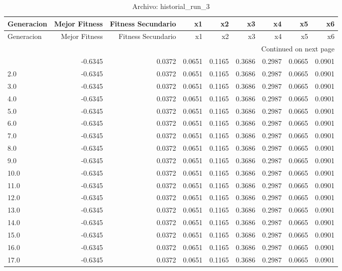 \begin{longtable}{lrrrrrrrr}
\caption{Archivo: historial\_run\_3}\label{tab:historial_run_3} \\
\toprule
Generacion & Mejor Fitness & Fitness Secundario & x1 & x2 & x3 & x4 & x5 & x6 \\
\midrule
\endfirsthead
\toprule
Generacion & Mejor Fitness & Fitness Secundario & x1 & x2 & x3 & x4 & x5 & x6 \\
\midrule
\endhead
\midrule
\multicolumn{9}{r}{Continued on next page} \\
\midrule
\endfoot
\bottomrule
\endlastfoot
1.0 & -0.6345 & 0.0372 & 0.0651 & 0.1165 & 0.3686 & 0.2987 & 0.0665 & 0.0901 \\
2.0 & -0.6345 & 0.0372 & 0.0651 & 0.1165 & 0.3686 & 0.2987 & 0.0665 & 0.0901 \\
3.0 & -0.6345 & 0.0372 & 0.0651 & 0.1165 & 0.3686 & 0.2987 & 0.0665 & 0.0901 \\
4.0 & -0.6345 & 0.0372 & 0.0651 & 0.1165 & 0.3686 & 0.2987 & 0.0665 & 0.0901 \\
5.0 & -0.6345 & 0.0372 & 0.0651 & 0.1165 & 0.3686 & 0.2987 & 0.0665 & 0.0901 \\
6.0 & -0.6345 & 0.0372 & 0.0651 & 0.1165 & 0.3686 & 0.2987 & 0.0665 & 0.0901 \\
7.0 & -0.6345 & 0.0372 & 0.0651 & 0.1165 & 0.3686 & 0.2987 & 0.0665 & 0.0901 \\
8.0 & -0.6345 & 0.0372 & 0.0651 & 0.1165 & 0.3686 & 0.2987 & 0.0665 & 0.0901 \\
9.0 & -0.6345 & 0.0372 & 0.0651 & 0.1165 & 0.3686 & 0.2987 & 0.0665 & 0.0901 \\
10.0 & -0.6345 & 0.0372 & 0.0651 & 0.1165 & 0.3686 & 0.2987 & 0.0665 & 0.0901 \\
11.0 & -0.6345 & 0.0372 & 0.0651 & 0.1165 & 0.3686 & 0.2987 & 0.0665 & 0.0901 \\
12.0 & -0.6345 & 0.0372 & 0.0651 & 0.1165 & 0.3686 & 0.2987 & 0.0665 & 0.0901 \\
13.0 & -0.6345 & 0.0372 & 0.0651 & 0.1165 & 0.3686 & 0.2987 & 0.0665 & 0.0901 \\
14.0 & -0.6345 & 0.0372 & 0.0651 & 0.1165 & 0.3686 & 0.2987 & 0.0665 & 0.0901 \\
15.0 & -0.6345 & 0.0372 & 0.0651 & 0.1165 & 0.3686 & 0.2987 & 0.0665 & 0.0901 \\
16.0 & -0.6345 & 0.0372 & 0.0651 & 0.1165 & 0.3686 & 0.2987 & 0.0665 & 0.0901 \\
17.0 & -0.6345 & 0.0372 & 0.0651 & 0.1165 & 0.3686 & 0.2987 & 0.0665 & 0.0901 \\

\end{longtable}
